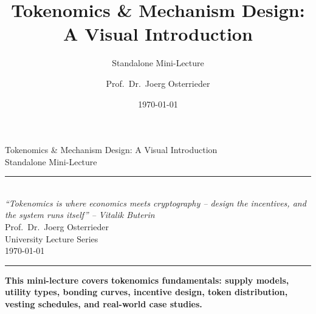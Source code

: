 \documentclass[8pt,aspectratio=169]{beamer}
\title{Tokenomics \& Mechanism Design: A Visual Introduction}
\subtitle{Standalone Mini-Lecture}
\author{Prof.~Dr.~Joerg Osterrieder}
\institute{University Lecture Series}
\date{\today}
\newcommand{\bottomnote}[1]{%
\vfill
\vspace{-2mm}
\textcolor{mllavender2}{\rule{\textwidth}{0.4pt}}
\vspace{1mm}
\footnotesize
\textbf{#1}
}
\begin{document}
\begin{frame}[plain]
\vspace{2cm}
\begin{center}
{\Huge\color{mlpurple} Tokenomics \& Mechanism Design: A Visual Introduction}\\[0.4cm]
{\Large\color{mlblue} Standalone Mini-Lecture}\\[0.3cm]
\textcolor{mlgray}{\rule{6cm}{0.4pt}}\\[0.3cm]
{\small\itshape ``Tokenomics is where economics meets cryptography -- design the incentives, and the system runs itself'' -- Vitalik Buterin}\\[1.5cm]
{\normalsize Prof.~Dr.~Joerg Osterrieder}\\[0.2cm]
{\small University Lecture Series}\\[0.2cm]
{\small \today}
\end{center}

\bottomnote{This mini-lecture covers tokenomics fundamentals: supply models, utility types, bonding curves, incentive design, token distribution, vesting schedules, and real-world case studies.}
\end{frame}
\end{document}

